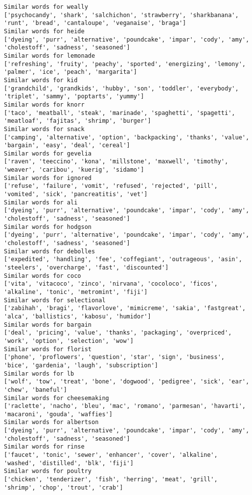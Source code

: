 \documentclass[11pt]{article}
\begin{document}
\begin{Verbatim}[commandchars=\\\{\}]
Similar words for weally
['psychocandy', 'shark', 'salchichon', 'strawberry', 'sharkbanana', 'runt', 'bread', 'cantaloupe', 'veganaise', 'braga']
Similar words for heide
['dyeing', 'purr', 'alternative', 'poundcake', 'impar', 'cody', 'amy', 'cholestoff', 'sadness', 'seasoned']
Similar words for lemonade
['refreshing', 'fruity', 'peachy', 'sported', 'energizing', 'lemony', 'palmer', 'ice', 'peach', 'margarita']
Similar words for kid
['grandchild', 'grandkids', 'hubby', 'son', 'toddler', 'everybody', 'triplet', 'sammy', 'poptarts', 'yummy']
Similar words for knorr
['taco', 'meatball', 'steak', 'marinade', 'spaghetti', 'spagetti', 'meatloaf', 'fajitas', 'shrimp', 'burger']
Similar words for snack
['camping', 'alternative', 'option', 'backpacking', 'thanks', 'value', 'bargain', 'easy', 'deal', 'cereal']
Similar words for gevelia
['raven', 'teeccino', 'kona', 'millstone', 'maxwell', 'timothy', 'weaver', 'caribou', 'kuerig', 'sidamo']
Similar words for ignored
['refuse', 'failure', 'vomit', 'refused', 'rejected', 'pill', 'vomited', 'sick', 'pancreatitis', 'vet']
Similar words for ali
['dyeing', 'purr', 'alternative', 'poundcake', 'impar', 'cody', 'amy', 'cholestoff', 'sadness', 'seasoned']
Similar words for hodgson
['dyeing', 'purr', 'alternative', 'poundcake', 'impar', 'cody', 'amy', 'cholestoff', 'sadness', 'seasoned']
Similar words for debolles
['expedited', 'handling', 'fee', 'coffegiant', 'outrageous', 'asin', 'steelers', 'overcharge', 'fast', 'discounted']
Similar words for coco
['vita', 'vitacoco', 'zinco', 'nirvana', 'cocoloco', 'ficos', 'alkaline', 'tonic', 'metromint', 'fiji']
Similar words for selectional
['zabihah', 'bragi', 'flavorlove', 'mimicreme', 'sakia', 'fastgreat', 'alca', 'ballistics', 'kabosu', 'humidor']
Similar words for bargain
['deal', 'pricing', 'value', 'thanks', 'packaging', 'overpriced', 'work', 'option', 'selection', 'wow']
Similar words for florist
['phone', 'proflowers', 'question', 'star', 'sign', 'business', 'bice', 'gardenia', 'laugh', 'subscription']
Similar words for lb
['wolf', 'tow', 'treat', 'bone', 'dogwood', 'pedigree', 'sick', 'ear', 'chew', 'baneful']
Similar words for cheesemaking
['raclette', 'nacho', 'bleu', 'mac', 'romano', 'parmesan', 'havarti', 'macaroni', 'gouda', 'waffies']
Similar words for albertson
['dyeing', 'purr', 'alternative', 'poundcake', 'impar', 'cody', 'amy', 'cholestoff', 'sadness', 'seasoned']
Similar words for rinse
['faucet', 'tonic', 'sewer', 'enhancer', 'cover', 'alkaline', 'washed', 'distilled', 'blk', 'fiji']
Similar words for poultry
['chicken', 'tenderizer', 'fish', 'herring', 'meat', 'grill', 'shrimp', 'chop', 'trout', 'crab']

\end{Verbatim}
\end{document}
